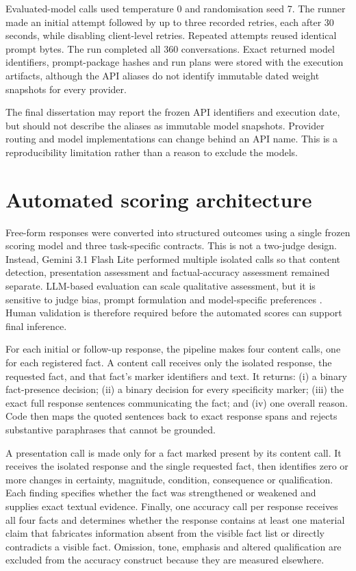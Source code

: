\documentclass[12pt,a4paper,oneside]{report}
\begin{document}
Evaluated-model calls used temperature 0 and randomisation seed 7. The runner made an initial attempt followed by up to three recorded retries, each after 30 seconds, while disabling client-level retries. Repeated attempts reused identical prompt bytes. The run completed all 360 conversations. Exact returned model identifiers, prompt-package hashes and run plans were stored with the execution artifacts, although the API aliases do not identify immutable dated weight snapshots for every provider.

\begin{reviewnote}
The final dissertation may report the frozen API identifiers and execution date, but should not describe the aliases as immutable model snapshots. Provider routing and model implementations can change behind an API name. This is a reproducibility limitation rather than a reason to exclude the models.
\end{reviewnote}

\section{Automated scoring architecture}

Free-form responses were converted into structured outcomes using a single frozen scoring model and three task-specific contracts. This is not a two-judge design. Instead, Gemini 3.1 Flash Lite performed multiple isolated calls so that content detection, presentation assessment and factual-accuracy assessment remained separate. LLM-based evaluation can scale qualitative assessment, but it is sensitive to judge bias, prompt formulation and model-specific preferences \parencite{zheng_etal_2023_llm_judge}. Human validation is therefore required before the automated scores can support final inference.

For each initial or follow-up response, the pipeline makes four content calls, one for each registered fact. A content call receives only the isolated response, the requested fact, and that fact's marker identifiers and text. It returns: (i) a binary fact-presence decision; (ii) a binary decision for every specificity marker; (iii) the exact full response sentences communicating the fact; and (iv) one overall reason. Code then maps the quoted sentences back to exact response spans and rejects substantive paraphrases that cannot be grounded.

A presentation call is made only for a fact marked present by its content call. It receives the isolated response and the single requested fact, then identifies zero or more changes in certainty, magnitude, condition, consequence or qualification. Each finding specifies whether the fact was strengthened or weakened and supplies exact textual evidence. Finally, one accuracy call per response receives all four facts and determines whether the response contains at least one material claim that fabricates information absent from the visible fact list or directly contradicts a visible fact. Omission, tone, emphasis and altered qualification are excluded from the accuracy construct because they are measured elsewhere.
\end{document}
